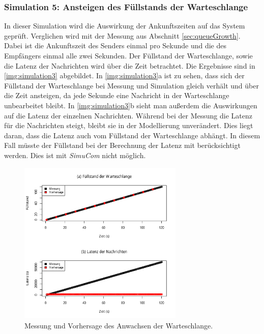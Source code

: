 \subsubsection{Simulation 5: Ansteigen des Füllstands der Warteschlange}
\label{sec:simulation3}
In dieser Simulation wird die Auswirkung der Ankunftszeiten auf das System geprüft. Verglichen wird mit der Messung aus Abschnitt \ref{sec:queueGrowth}. Dabei ist die Ankunftszeit des Senders einmal pro Sekunde und die des Empfängers einmal alle zwei Sekunden. Der Füllstand der Warteschlange, sowie die Latenz der Nachrichten wird über die Zeit betrachtet.
Die Ergebnisse sind in \autoref{img:simulation3} abgebildet. In \autoref{img:simulation3}a ist zu sehen, dass sich der Füllstand der Warteschlange bei Messung und Simulation gleich verhält und über die Zeit ansteigen, da jede Sekunde eine Nachricht in der Warteschlange unbearbeitet bleibt. In \autoref{img:simulation3}b sieht man außerdem die Auswirkungen auf die Latenz der einzelnen Nachrichten. Während bei der Messung die Latenz für die Nachrichten steigt, bleibt sie in der Modellierung unverändert. Dies liegt daran, dass die Latenz auch vom Füllstand der Warteschlange abhängt. In diesem Fall müsste der Füllstand bei der Berechnung der Latenz mit berücksichtigt werden. Dies ist mit \emph{SimuCom} nicht möglich. 
\begin{figure}[t]
\center
  \includegraphics[width=0.7\textwidth]{images/modelSimulationResults/simulation3.pdf}
  \caption{Messung und Vorhersage des Anwachsen der Warteschlange.}
  \label{img:simulation3}
\end{figure}

